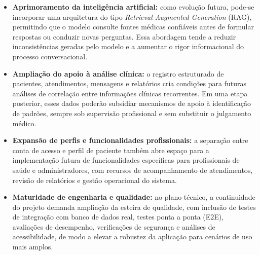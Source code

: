\begin{itemize}
\item \textbf{Aprimoramento da inteligência artificial:} como evolução futura, pode-se incorporar uma arquitetura do tipo \textit{Retrieval-Augmented Generation} (RAG), permitindo que o modelo consulte fontes médicas confiáveis antes de formular respostas ou conduzir novas perguntas. Essa abordagem tende a reduzir inconsistências geradas pelo modelo e a aumentar o rigor informacional do processo conversacional.

\item \textbf{Ampliação do apoio à análise clínica:} o registro estruturado de pacientes, atendimentos, mensagens e relatórios cria condições para futuras análises de correlação entre informações clínicas recorrentes. Em uma etapa posterior, esses dados poderão subsidiar mecanismos de apoio à identificação de padrões, sempre sob supervisão profissional e sem substituir o julgamento médico.

\item \textbf{Expansão de perfis e funcionalidades profissionais:} a separação entre conta de acesso e perfil de paciente também abre espaço para a implementação futura de funcionalidades específicas para profissionais de saúde e administradores, com recursos de acompanhamento de atendimentos, revisão de relatórios e gestão operacional do sistema.

\item \textbf{Maturidade de engenharia e qualidade:} no plano técnico, a continuidade do projeto demanda ampliação da esteira de qualidade, com inclusão de testes de integração com banco de dados real, testes ponta a ponta (E2E), avaliações de desempenho, verificações de segurança e análises de acessibilidade, de modo a elevar a robustez da aplicação para cenários de uso mais amplos.
\end{itemize}
